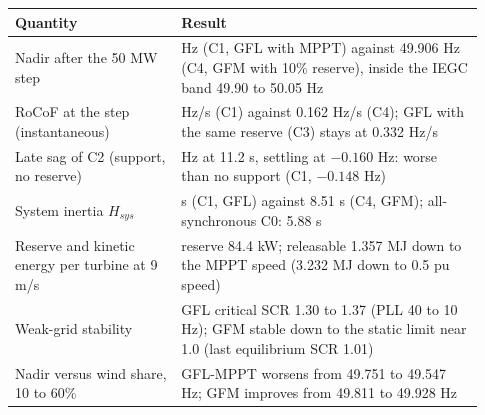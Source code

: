 {\renewcommand{\arraystretch}{1.15}\footnotesize
\begin{tabular}{@{}>{\raggedright\arraybackslash}p{0.33\linewidth}>{\raggedright\arraybackslash}p{0.60\linewidth}@{}}
\toprule
Quantity & Result\\\midrule
Nadir after the 50 MW step & 49.659 Hz (C1, GFL with MPPT) against 49.906 Hz (C4, GFM with 10\% reserve), inside the IEGC band 49.90 to 50.05 Hz\\
RoCoF at the step (instantaneous) & 0.332 Hz/s (C1) against 0.162 Hz/s (C4); GFL with the same reserve (C3) stays at 0.332 Hz/s\\
Late sag of C2 (support, no reserve) & 49.815 Hz at 11.2 s, settling at $-0.160$ Hz: worse than no support (C1, $-0.148$ Hz)\\
System inertia $H_{sys}$ & 3.76 s (C1, GFL) against 8.51 s (C4, GFM); all-synchronous C0: 5.88 s\\
Reserve and kinetic energy per turbine at 9 m/s & reserve 84.4 kW; releasable 1.357 MJ down to the MPPT speed (3.232 MJ down to 0.5 pu speed)\\
Weak-grid stability & GFL critical SCR 1.30 to 1.37 (PLL 40 to 10 Hz); GFM stable down to the static limit near 1.0 (last equilibrium SCR 1.01)\\
Nadir versus wind share, 10 to 60\% & GFL-MPPT worsens from 49.751 to 49.547 Hz; GFM improves from 49.811 to 49.928 Hz\\
\bottomrule
\end{tabular}}
